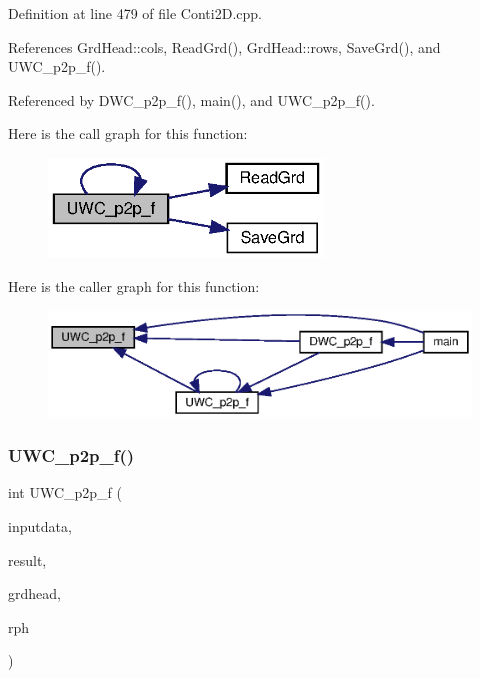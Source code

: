 Definition at line 479 of file Conti2\+D.\+cpp.



References Grd\+Head\+::cols, Read\+Grd(), Grd\+Head\+::rows, Save\+Grd(), and U\+W\+C\+\_\+p2p\+\_\+f().



Referenced by D\+W\+C\+\_\+p2p\+\_\+f(), main(), and U\+W\+C\+\_\+p2p\+\_\+f().

Here is the call graph for this function\+:
\nopagebreak
\begin{figure}[H]
\begin{center}
\leavevmode
\includegraphics[width=207pt]{Conti2D_8cpp_af82757cb7e0f4f398e774b4e89b9ea72_af82757cb7e0f4f398e774b4e89b9ea72_cgraph}
\end{center}
\end{figure}
Here is the caller graph for this function\+:\nopagebreak
\begin{figure}[H]
\begin{center}
\leavevmode
\includegraphics[width=350pt]{Conti2D_8cpp_af82757cb7e0f4f398e774b4e89b9ea72_af82757cb7e0f4f398e774b4e89b9ea72_icgraph}
\end{center}
\end{figure}
\mbox{\label{Conti2D_8cpp_a016dc620865e33635aabc81c129eac30_a016dc620865e33635aabc81c129eac30}} 
\subsubsection{U\+W\+C\+\_\+p2p\+\_\+f()\hspace{0.1cm}{\footnotesize\ttfamily [2/2]}}
{\footnotesize\ttfamily int U\+W\+C\+\_\+p2p\+\_\+f (\begin{DoxyParamCaption}\item[{double $\ast$}]{inputdata,  }\item[{double $\ast$}]{result,  }\item[{\textbf{ Grd\+Head}}]{grdhead,  }\item[{double}]{rph }\end{DoxyParamCaption})}



